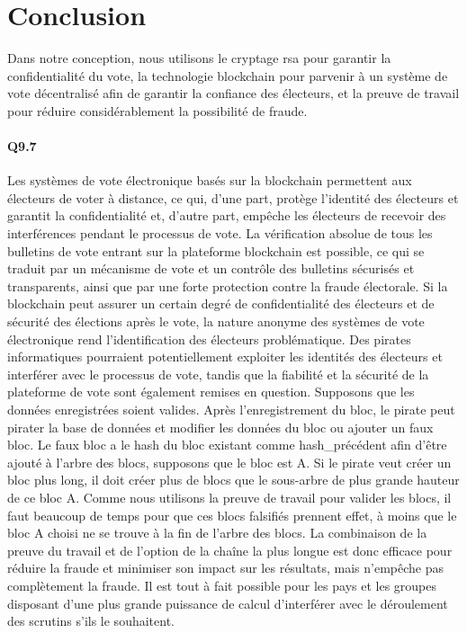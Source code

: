 \documentclass{article}
\begin{document}
\section{Conclusion}
Dans notre conception, nous utilisons le cryptage rsa pour garantir la confidentialité du vote, la technologie blockchain pour parvenir à un système de vote décentralisé afin de garantir la confiance des électeurs, et la preuve de travail pour réduire considérablement la possibilité de fraude.
\paragraph*{Q9.7}
Les systèmes de vote électronique basés sur la blockchain permettent aux électeurs de voter à distance, ce qui, d'une part, protège l'identité des électeurs et garantit la confidentialité et, d'autre part, empêche les électeurs de recevoir des interférences pendant le processus de vote. La vérification absolue de tous les bulletins de vote entrant sur la plateforme blockchain est possible, ce qui se traduit par un mécanisme de vote et un contrôle des bulletins sécurisés et transparents, ainsi que par une forte protection contre la fraude électorale.\newline
Si la blockchain peut assurer un certain degré de confidentialité des électeurs et de sécurité des élections après le vote, la nature anonyme des systèmes de vote électronique rend l'identification des électeurs problématique. Des pirates informatiques pourraient potentiellement exploiter les identités des électeurs et interférer avec le processus de vote, tandis que la fiabilité et la sécurité de la plateforme de vote sont également remises en question.\newline
Supposons que les données enregistrées soient valides. Après l'enregistrement du bloc, le pirate peut pirater la base de données et modifier les données du bloc ou ajouter un faux bloc. Le faux bloc a le hash du bloc existant comme hash\_précédent afin d'être ajouté à l'arbre des blocs, supposons que le bloc est A. Si le pirate veut créer un bloc plus long, il doit créer plus de blocs que le sous-arbre de plus grande hauteur de ce bloc A.\newline
Comme nous utilisons la preuve de travail pour valider les blocs, il faut beaucoup de temps pour que ces blocs falsifiés prennent effet, à moins que le bloc A choisi ne se trouve à la fin de l'arbre des blocs.\newline
La combinaison de la preuve du travail et de l'option de la chaîne la plus longue est donc efficace pour réduire la fraude et minimiser son impact sur les résultats, mais n'empêche pas complètement la fraude. Il est tout à fait possible pour les pays et les groupes disposant d'une plus grande puissance de calcul d'interférer avec le déroulement des scrutins s'ils le souhaitent. 
\end{document}
